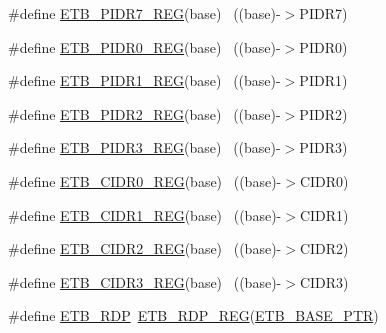 \begin{DoxyCompactItemize}
\item 
\#define \hyperlink{group___e_t_b___register___accessor___macros_ga11ac77efb6a30e20b1ea532f878440d1}{E\+T\+B\+\_\+\+P\+I\+D\+R7\+\_\+\+R\+EG}(base)                                        ~((base)-\/$>$P\+I\+D\+R7)
\item 
\#define \hyperlink{group___e_t_b___register___accessor___macros_gafbe63cb13b29216172a7147ea0d44866}{E\+T\+B\+\_\+\+P\+I\+D\+R0\+\_\+\+R\+EG}(base)                                        ~((base)-\/$>$P\+I\+D\+R0)
\item 
\#define \hyperlink{group___e_t_b___register___accessor___macros_ga3cd40cff5017b70471ca2bc51608d6ef}{E\+T\+B\+\_\+\+P\+I\+D\+R1\+\_\+\+R\+EG}(base)                                        ~((base)-\/$>$P\+I\+D\+R1)
\item 
\#define \hyperlink{group___e_t_b___register___accessor___macros_gaa93b829ecd5ec4dcd8fac4cb0c6836f4}{E\+T\+B\+\_\+\+P\+I\+D\+R2\+\_\+\+R\+EG}(base)                                        ~((base)-\/$>$P\+I\+D\+R2)
\item 
\#define \hyperlink{group___e_t_b___register___accessor___macros_ga65c57e99e594bcbb657d7df4db0a87eb}{E\+T\+B\+\_\+\+P\+I\+D\+R3\+\_\+\+R\+EG}(base)                                        ~((base)-\/$>$P\+I\+D\+R3)
\item 
\#define \hyperlink{group___e_t_b___register___accessor___macros_gaef3bef6ae50cff5320041120f3afe155}{E\+T\+B\+\_\+\+C\+I\+D\+R0\+\_\+\+R\+EG}(base)                                        ~((base)-\/$>$C\+I\+D\+R0)
\item 
\#define \hyperlink{group___e_t_b___register___accessor___macros_ga78418b5ed936fc13437ad160c08e1fb4}{E\+T\+B\+\_\+\+C\+I\+D\+R1\+\_\+\+R\+EG}(base)                                        ~((base)-\/$>$C\+I\+D\+R1)
\item 
\#define \hyperlink{group___e_t_b___register___accessor___macros_ga5b6b85634c6638877fb7e64d4d36dc64}{E\+T\+B\+\_\+\+C\+I\+D\+R2\+\_\+\+R\+EG}(base)                                        ~((base)-\/$>$C\+I\+D\+R2)
\item 
\#define \hyperlink{group___e_t_b___register___accessor___macros_gafcbde86bf4b8213b6d778e9d84064757}{E\+T\+B\+\_\+\+C\+I\+D\+R3\+\_\+\+R\+EG}(base)                                        ~((base)-\/$>$C\+I\+D\+R3)
\item 
\#define \hyperlink{group___e_t_b___register___accessor___macros_ga36227997a6c919a1edd30862c465da95}{E\+T\+B\+\_\+\+R\+DP}~\hyperlink{group___e_t_b___register___accessor___macros_ga36817424cf06e4403d00506c273da5c5}{E\+T\+B\+\_\+\+R\+D\+P\+\_\+\+R\+EG}(\hyperlink{group___e_t_b___peripheral_gaaefe9b614cb5542a69cb7461307f1267}{E\+T\+B\+\_\+\+B\+A\+S\+E\+\_\+\+P\+TR})

\end{DoxyCompactItemize}
